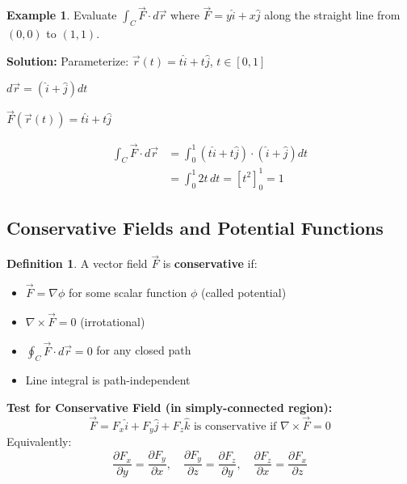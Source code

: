 \documentclass[12pt,a4paper]{article}
\theoremstyle{definition}
\newtheorem{definition}[theorem]{Definition}
\newtheorem{example}[theorem]{Example}
\begin{document}
\begin{example}
Evaluate $\int_C \vec{F} \cdot d\vec{r}$ where $\vec{F} = y\hat{i} + x\hat{j}$ along the straight line from $(0,0)$ to $(1,1)$.

\textbf{Solution:}
Parameterize: $\vec{r}(t) = t\hat{i} + t\hat{j}$, $t \in [0,1]$

$d\vec{r} = (\hat{i} + \hat{j})dt$

$\vec{F}(\vec{r}(t)) = t\hat{i} + t\hat{j}$

\begin{align*}
\int_C \vec{F} \cdot d\vec{r} &= \int_0^1 (t\hat{i} + t\hat{j}) \cdot (\hat{i} + \hat{j})dt \\
&= \int_0^1 2t\,dt = \left[t^2\right]_0^1 = 1
\end{align*}
\end{example}

\subsection{Conservative Fields and Potential Functions}

\begin{definition}
A vector field $\vec{F}$ is \textbf{conservative} if:
\begin{itemize}
    \item $\vec{F} = \nabla\phi$ for some scalar function $\phi$ (called potential)
    \item $\nabla \times \vec{F} = 0$ (irrotational)
    \item $\oint_C \vec{F} \cdot d\vec{r} = 0$ for any closed path
    \item Line integral is path-independent
\end{itemize}
\end{definition}

\begin{importantbox}
\textbf{Test for Conservative Field (in simply-connected region):}
\[
\vec{F} = F_x\hat{i} + F_y\hat{j} + F_z\hat{k} \text{ is conservative if } \nabla \times \vec{F} = 0
\]
Equivalently:
\[
\frac{\partial F_x}{\partial y} = \frac{\partial F_y}{\partial x}, \quad \frac{\partial F_y}{\partial z} = \frac{\partial F_z}{\partial y}, \quad \frac{\partial F_z}{\partial x} = \frac{\partial F_x}{\partial z}
\]
\end{importantbox}
\end{document}
